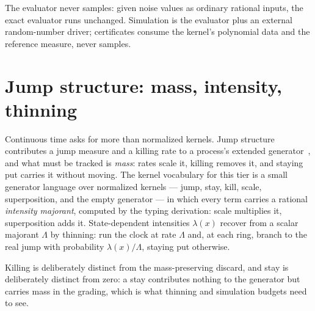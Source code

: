The evaluator never samples: given
noise values as ordinary rational inputs, the exact evaluator runs
unchanged. Simulation is the evaluator plus an external random-number
driver; certificates consume the kernel's polynomial data and the
reference measure, never samples.

\section{Jump structure: mass, intensity, thinning}
\label{sec:mk-jump}

Continuous time asks for more than normalized kernels. Jump structure
contributes a jump measure and a killing rate to a process's extended
generator~\cite{davis-1993,ethier-kurtz-1986}, and what must be
tracked is \emph{mass}: rates scale it, killing removes it, and
staying put carries it without moving. The kernel vocabulary for
this tier is a small generator language over normalized
kernels --- jump, stay, kill, scale, superposition, and the empty
generator --- in which every term carries a rational
\emph{intensity majorant}, computed by the typing derivation: scale
multiplies it, superposition adds it.
State-dependent intensities $\lambda(x)$ recover from a scalar
majorant $\Lambda$ by thinning: run the clock at rate $\Lambda$ and,
at each ring, branch to the real jump with probability
$\lambda(x)/\Lambda$, staying put otherwise.

Killing is deliberately
distinct from the mass-preserving discard, and stay is deliberately
distinct from zero: a stay contributes nothing to the generator but
carries mass in the grading, which is what thinning and simulation
budgets need to see.

